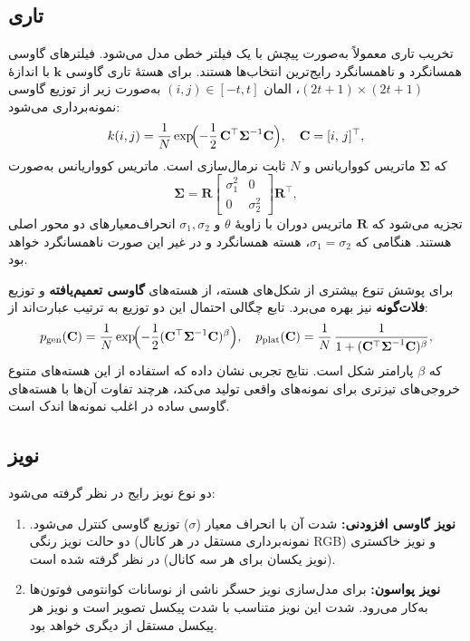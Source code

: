 \subsection{تاری}
تخریب تاری معمولاً به‌صورت پیچش با یک فیلتر خطی مدل می‌شود. فیلترهای گاوسی همسانگرد و ناهمسانگرد رایج‌ترین انتخاب‌ها هستند. برای هستهٔ تاری گاوسی $\mathbf{k}$ با اندازهٔ $(2t+1)\times(2t+1)$، المان $(i,j) \in [-t,t]$ به‌صورت زیر از توزیع گاوسی نمونه‌برداری می‌شود:
\begin{equation}
	\label{eq:gauss_kernel}
	k(i,j) = \frac{1}{N}\exp\!\Bigl(-\frac{1}{2}\,\mathbf{C}^{\top}\boldsymbol{\Sigma}^{-1}\mathbf{C}\Bigr), \quad \mathbf{C}=[i,\,j]^{\top},
\end{equation}
که $\boldsymbol{\Sigma}$ ماتریس کوواریانس و $N$ ثابت نرمال‌سازی است. ماتریس کوواریانس به‌صورت
\begin{equation}
	\boldsymbol{\Sigma} = \mathbf{R}
	\begin{bmatrix}
		\sigma_{1}^{2} & 0 \\
		0 & \sigma_{2}^{2}
	\end{bmatrix}
	\mathbf{R}^{\top},
\end{equation}
تجزیه می‌شود که $\mathbf{R}$ ماتریس دوران با زاویهٔ $\theta$ و $\sigma_{1},\sigma_{2}$ انحراف‌معیارهای دو محور اصلی هستند. هنگامی‌ که $\sigma_{1}=\sigma_{2}$، هسته همسانگرد و در غیر این صورت ناهمسانگرد خواهد بود.

برای پوشش تنوع بیشتری از شکل‌های هسته،  از هسته‌های \textbf{گاوسی تعمیم‌یافته} و توزیع \textbf{فلات‌گونه} نیز بهره می‌برد. تابع چگالی احتمال این دو توزیع به ترتیب عبارت‌اند از:
\[
p_{\text{gen}}(\mathbf{C}) = \frac{1}{N}\exp\!\Bigl(-\frac{1}{2}(\mathbf{C}^{\top}\boldsymbol{\Sigma}^{-1}\mathbf{C})^{\beta}\Bigr),
\quad
p_{\text{plat}}(\mathbf{C}) = \frac{1}{N}\,\frac{1}{1+(\mathbf{C}^{\top}\boldsymbol{\Sigma}^{-1}\mathbf{C})^{\beta}},
\]
که $\beta$ پارامتر شکل است. نتایج تجربی نشان داده که استفاده از این هسته‌های متنوع خروجی‌های تیزتری برای نمونه‌های واقعی تولید می‌کند، هرچند تفاوت آن‌ها با هسته‌های گاوسی ساده در اغلب نمونه‌ها اندک است.

\subsection{نویز}
دو نوع نویز رایج در نظر گرفته می‌شود:
\begin{enumerate}
	\item \textbf{نویز گاوسی افزودنی:} شدت آن با انحراف معیار ($\sigma$) توزیع گاوسی کنترل می‌شود. دو حالت نویز رنگی (نمونه‌برداری مستقل در هر کانال RGB) و نویز خاکستری (نویز یکسان برای هر سه کانال) در نظر گرفته شده است.
	\item \textbf{نویز پواسون:} برای مدل‌سازی نویز حسگر ناشی از نوسانات کوانتومی فوتون‌ها به‌کار می‌رود. شدت این نویز متناسب با شدت پیکسل تصویر است و نویز هر پیکسل مستقل از دیگری خواهد بود.
\end{enumerate}

